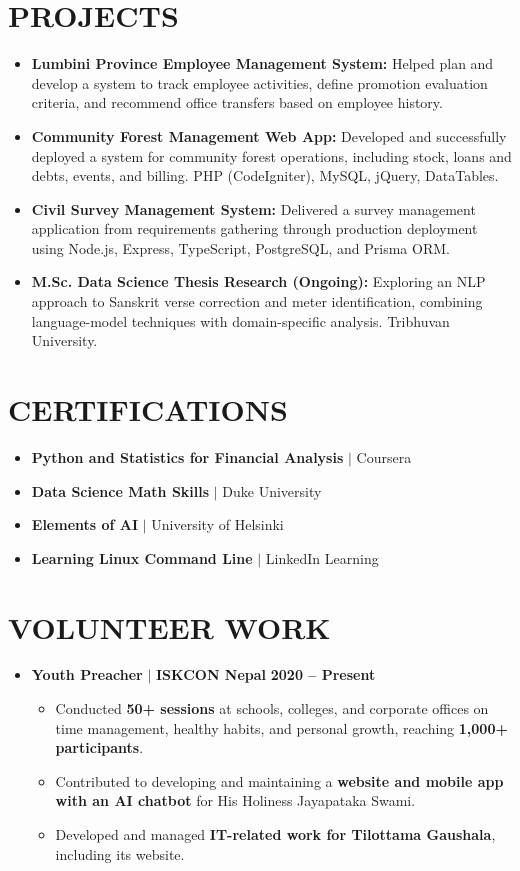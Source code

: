 \documentclass[10pt,a4paper]{article}
\begin{document}
\section{PROJECTS}
\begin{itemize}
    \item \textbf{Lumbini Province Employee Management System:} Helped plan and develop a system to track employee activities, define promotion evaluation criteria, and recommend office transfers based on employee history.
    \item \textbf{Community Forest Management Web App:} Developed and successfully deployed a system for community forest operations, including stock, loans and debts, events, and billing. PHP (CodeIgniter), MySQL, jQuery, DataTables.
    \item \textbf{Civil Survey Management System:} Delivered a survey management application from requirements gathering through production deployment using Node.js, Express, TypeScript, PostgreSQL, and Prisma ORM.
    \item \textbf{M.Sc. Data Science Thesis Research (Ongoing):} Exploring an NLP approach to Sanskrit verse correction and meter identification, combining language-model techniques with domain-specific analysis. Tribhuvan University.
\end{itemize}

\section{CERTIFICATIONS}
\begin{itemize}
    \item \textbf{Python and Statistics for Financial Analysis} $|$ Coursera 
    \item \textbf{Data Science Math Skills} $|$ Duke University
    \item \textbf{Elements of AI} $|$ University of Helsinki
    \item \textbf{Learning Linux Command Line} $|$ LinkedIn Learning
\end{itemize}

\section{VOLUNTEER WORK}
\begin{itemize}[leftmargin=1em, label={}]
    \item \textbf{Youth Preacher} $|$ \textbf{ISKCON Nepal} \hfill \textbf{2020 -- Present} 
    \begin{itemize}
        \item Conducted \textbf{50+ sessions} at schools, colleges, and corporate offices on time management, healthy habits, and personal growth, reaching \textbf{1,000+ participants}.
        \item Contributed to developing and maintaining a \textbf{website and mobile app with an AI chatbot} for His Holiness Jayapataka Swami.
        \item Developed and managed \textbf{IT-related work for Tilottama Gaushala}, including its website.
    \end{itemize}
\end{itemize}
\end{document}
